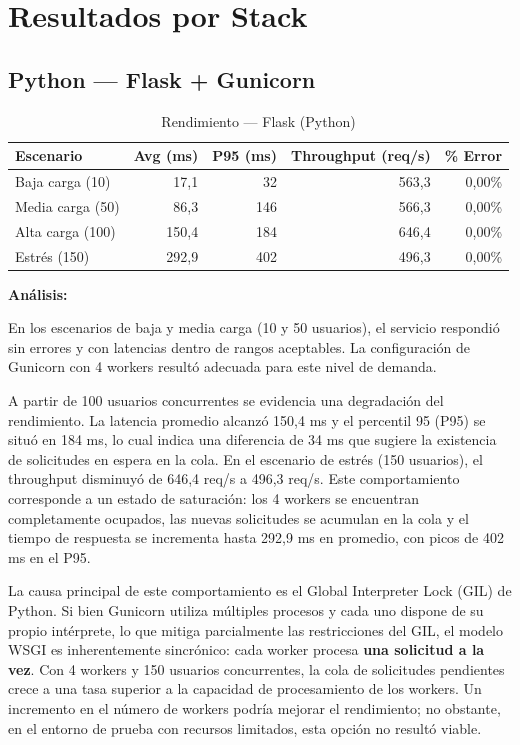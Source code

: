 \documentclass[12pt,a4paper]{article}
\begin{document}
\newpage

\section{Resultados por Stack}

\subsection{Python --- Flask + Gunicorn}

\begin{table}[h]
\centering
\small
\begin{tabular}{lrrrr}
\toprule
\textbf{Escenario} & \textbf{Avg (ms)} & \textbf{P95 (ms)} & \textbf{Throughput (req/s)} & \textbf{\% Error} \\
\midrule
Baja carga (10)  & 17,1 & 32  & 563,3 & 0,00\% \\
Media carga (50) & 86,3 & 146 & 566,3 & 0,00\% \\
Alta carga (100) & 150,4& 184 & 646,4 & 0,00\% \\
Estrés (150)     & 292,9& 402 & 496,3 & 0,00\% \\
\bottomrule
\end{tabular}
\caption{Rendimiento --- Flask (Python)}
\end{table}

\vspace{0.3cm}
\textbf{Análisis:}

En los escenarios de baja y media carga (10 y 50 usuarios), el servicio respondió sin errores y con latencias dentro de rangos aceptables. La configuración de Gunicorn con 4 workers resultó adecuada para este nivel de demanda.

A partir de 100 usuarios concurrentes se evidencia una degradación del rendimiento. La latencia promedio alcanzó 150,4 ms y el percentil 95 (P95) se situó en 184 ms, lo cual indica una diferencia de 34 ms que sugiere la existencia de solicitudes en espera en la cola. En el escenario de estrés (150 usuarios), el throughput disminuyó de 646,4 req/s a 496,3 req/s. Este comportamiento corresponde a un estado de saturación: los 4 workers se encuentran completamente ocupados, las nuevas solicitudes se acumulan en la cola y el tiempo de respuesta se incrementa hasta 292,9 ms en promedio, con picos de 402 ms en el P95.

La causa principal de este comportamiento es el Global Interpreter Lock (GIL) de Python. Si bien Gunicorn utiliza múltiples procesos y cada uno dispone de su propio intérprete, lo que mitiga parcialmente las restricciones del GIL, el modelo WSGI es inherentemente sincrónico: cada worker procesa \textbf{una solicitud a la vez}. Con 4 workers y 150 usuarios concurrentes, la cola de solicitudes pendientes crece a una tasa superior a la capacidad de procesamiento de los workers. Un incremento en el número de workers podría mejorar el rendimiento; no obstante, en el entorno de prueba con recursos limitados, esta opción no resultó viable.
\end{document}
